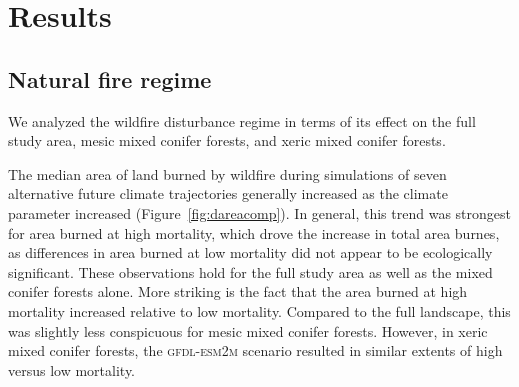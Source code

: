 \section{Results}

\subsection*{Natural fire regime}

We analyzed the wildfire disturbance regime in terms of its effect on the full study area, mesic mixed conifer forests, and xeric mixed conifer forests.

The median area of land burned by wildfire during simulations of seven alternative future climate trajectories generally increased as the climate parameter increased (Figure~\ref{fig:dareacomp}). In general, this trend was strongest for area burned at high mortality, which drove the increase in total area burnes, as differences in area burned at low mortality did not appear to be ecologically significant. These observations hold for the full study area as well as the mixed conifer forests alone. More striking is the fact that the area burned at high mortality increased relative to low mortality. Compared to the full landscape, this was slightly less conspicuous for mesic mixed conifer forests. However, in xeric mixed conifer forests, the \textsc{gfdl-esm2m} scenario resulted in similar extents of high versus low mortality.


